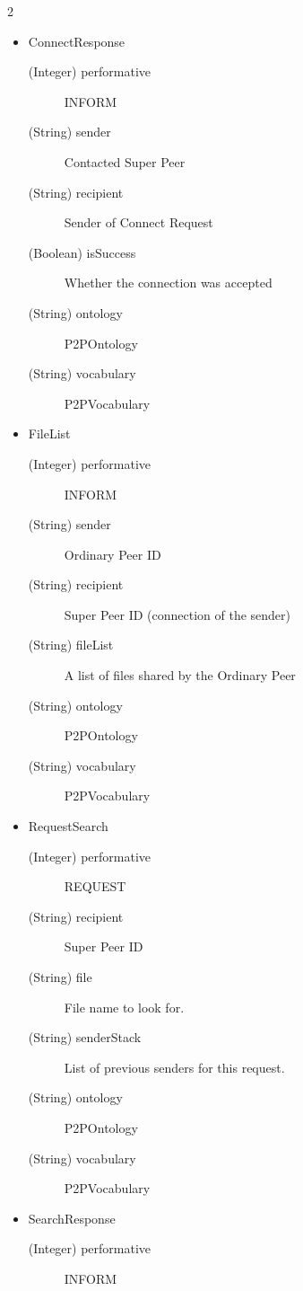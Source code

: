 \begin{multicols}{2}
\begin{itemize}
\begin{description}
      \item[(String) ontology] P2POntology
      \item[(String) vocabulary] P2PVocabulary
    \end{description}
  \item{ConnectResponse}
    \begin{description}
      \item[(Integer) performative] INFORM
      \item[(String) sender] Contacted Super Peer
      \item[(String) recipient] Sender of Connect Request
      \item[(Boolean) isSuccess] Whether the connection was accepted
      \item[(String) ontology] P2POntology
      \item[(String) vocabulary] P2PVocabulary
    \end{description}
  \item{FileList}
    \begin{description}
      \item[(Integer) performative] INFORM
      \item[(String) sender] Ordinary Peer ID
      \item[(String) recipient] Super Peer ID (connection of the sender)
      \item[(String) fileList] A list of files shared by the Ordinary Peer
      \item[(String) ontology] P2POntology
      \item[(String) vocabulary] P2PVocabulary
    \end{description}
  \item{RequestSearch }
    \begin{description}
      \item[(Integer) performative] REQUEST
      \item[(String) recipient] Super Peer ID
      \item[(String) file] File name to look for.
      \item[(String) senderStack] List of previous senders for this request.
      \item[(String) ontology] P2POntology
      \item[(String) vocabulary] P2PVocabulary
    \end{description}
  \item{SearchResponse}
    \begin{description}
      \item[(Integer) performative] INFORM

\end{description}
\end{itemize}
\end{multicols}
